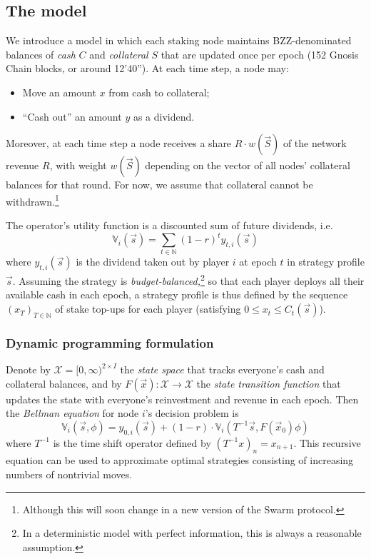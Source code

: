 \subsection*{The model}

We introduce a model in which each staking node maintains BZZ-denominated balances of \emph{cash} $C$ and \emph{collateral} $S$ that are updated once per epoch (152 Gnosis Chain blocks, or around 12'40''). At each time step, a node may:

\begin{itemize}
\item Move an amount $x$ from cash to collateral;
\item ``Cash out'' an amount $y$ as a dividend.
\end{itemize}

Moreover, at each time step a node receives a share $R\cdot w(\vec{S})$ of the network revenue $R$, with weight $w(\vec{S})$ depending on the vector of all nodes' collateral balances for that round. For now, we assume that collateral cannot be withdrawn.\footnote{Although this will soon change in a new version of the Swarm protocol.}

The operator's utility function is a discounted sum of future dividends, i.e.
\[
  \mathbb{V}_i(\vec{s}) = \sum_{t\in\mathbb{N}}(1-r)^t y_{t,i}(\vec{s})
\]
where $y_{t,i}(\vec{s})$ is the dividend taken out by player $i$ at epoch $t$ in strategy profile $\vec{s}$. Assuming the strategy is \emph{budget-balanced,}\footnote{In a deterministic model with perfect information, this is always a reasonable assumption.} so that each player deploys all their available cash in each epoch, a strategy profile is thus defined by the sequence $(x_T)_{T\in\mathbb{N}}$ of stake top-ups for each player (satisfying $0\leq x_t\leq C_t(\vec{s})$).

\subsubsection*{Dynamic programming formulation}

Denote by $\mathcal{X} = [0,\infty)^{2\times I}$ the \emph{state space} that tracks everyone's cash and collateral balances, and by $F(\vec{x}):\mathcal{X}\rightarrow\mathcal{X}$ the \emph{state transition function} that updates the state with everyone's reinvestment and revenue in each epoch. Then the \emph{Bellman equation} for node $i$'s decision problem is
%
\begin{equation}
  \mathbb{V}_i(\vec{s},\phi) = y_{0,i}(\vec{s}) + 
    (1-r)\cdot\mathbb{V}_i(T^{-1}\vec{s}, F(\vec{x}_0)\phi)
\end{equation}
%
where $T^{-1}$ is the time shift operator defined by $(T^{-1}x)_n = x_{n+1}$. This recursive equation can be used to approximate optimal strategies consisting of increasing numbers of nontrivial moves.

